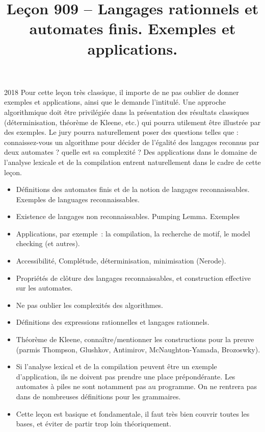 \documentclass{agregfiche}
\title{Leçon 909 -- Langages rationnels et automates finis.  Exemples et applications.}
\begin{document}
\maketitle

\secrapports

\begin{rapport}{2018}
Pour cette leçon très classique, il importe de ne pas oublier de donner exemples et applications, ainsi
que le demande l’intitulé.
Une approche algorithmique doit être privilégiée dans la présentation des résultats classiques (déterminisation, théorème de
Kleene, etc.) qui pourra utilement être illustrée par des exemples. Le jury pourra naturellement poser des questions telles que : connaissez-vous un algorithme pour décider de l’égalité des langages reconnus par deux automates ? quelle est sa complexité ?
Des applications dans le domaine de l’analyse lexicale et de la compilation entrent naturellement dans
le cadre de cette leçon.
\end{rapport}

\secindispensables

\begin{itemize}
\item  Définitions des automates finis et de la notion de langages reconnaissables. Exemples de languages reconnaissables.
\item Existence de langages non reconnaissables. Pumping Lemma. Exemples
\item Applications, par exemple~: la compilation, la recherche de motif, le
    model checking (et autres).
\item Accessibilité, Complétude, déterminisation, minimisation (Nerode).
\item Propriétés de clôture des langages reconnaissables, et construction
    effective sur les automates.
\item Ne pas oublier les complexités des algorithmes.
\item Définitions des expressions rationnelles et langages rationnels.
\item Théorème de Kleene, connaître/mentionner les constructions pour la preuve (parmis Thompson, Glushkov, Antimirov, McNaughton-Yamada, Brozoswky).
\end{itemize}


\secpieges

\begin{itemize}
\item Si l'analyse lexical et de la compilation peuvent être un exemple d'application, ils ne doivent pas prendre une place prépondérante. Les automates à piles ne sont notamment pas au programme. On ne rentrera pas dans de nombreuses définitions pour les grammaires.
\item Cette leçon est basique et fondamentale, il faut très bien couvrir toutes les bases, et éviter de partir trop loin théoriquement.
\end{itemize}
\end{document}
